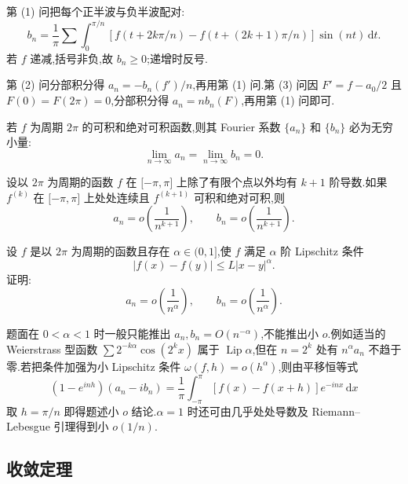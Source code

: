 \begin{solution}
    第 (1) 问把每个正半波与负半波配对:
    \[
        b_n=\dfrac{1}{\pi}\sum\int_0^{\pi/n}
        [f(t+2k\pi/n)-f(t+(2k+1)\pi/n)]\sin(nt)\,\mathrm{d}t.
    \]
    若 $f$ 递减,括号非负,故 $b_n\geq0$;递增时反号.

    第 (2) 问分部积分得 $a_n=-b_n(f')/n$,再用第 (1) 问.第 (3) 问因
    $F'=f-a_0/2$ 且 $F(0)=F(2\pi)=0$,分部积分得 $a_n=nb_n(F)$,再用第 (1) 问即可.
\end{solution}

\begin{proposition}[\markstar]
    若 $f$ 为周期 $2\pi$ 的可积和绝对可积函数,则其 Fourier 系数 $\{a_n\}$ 和 $\{b_n\}$ 必为无穷小量:
    \[
        \displaystyle\lim\limits_{n\to\infty}a_n=\lim\limits_{n\to\infty}b_n=0.
    \]
\end{proposition}

\begin{proposition}[\markstar]
    设以 $2\pi$ 为周期的函数 $f$ 在 $\lbrack -\pi,\pi\rbrack$ 上除了有限个点以外均有 $k+1$ 阶导数.如果 $f^{(k)}$ 在 $\lbrack -\pi,\pi\rbrack$ 上处处连续且 $f^{(k+1)}$ 可积和绝对可积,则
    \[
        a_n=o\left(\dfrac{1}{n^{k+1}}\right),
        \qquad
        b_n=o\left(\dfrac{1}{n^{k+1}}\right).
    \]
\end{proposition}

\begin{example}
    设 $f$ 是以 $2\pi$ 为周期的函数且存在 $\alpha\in(0,1\rbrack$,使 $f$ 满足 $\alpha$ 阶 Lipschitz 条件
    \[
        |f(x)-f(y)|\leq L|x-y|^\alpha.
    \]
    证明:
    \[
        a_n=o\left(\dfrac{1}{n^\alpha}\right),
        \qquad
        b_n=o\left(\dfrac{1}{n^\alpha}\right).
    \]
\end{example}
\exampleblank

\begin{solution}
    题面在 $0<\alpha<1$ 时一般只能推出
    $a_n,b_n=O(n^{-\alpha})$,不能推出小 $o$.例如适当的 Weierstrass 型函数
    $\displaystyle\sum 2^{-k\alpha}\cos(2^kx)$ 属于 $\operatorname{Lip}\alpha$,但在 $n=2^k$ 处有
    $n^\alpha a_n$ 不趋于零.若把条件加强为小 Lipschitz 条件
    $\omega(f,h)=o(h^\alpha)$,则由平移恒等式
    \[
        (1-e^{inh})(a_n-ib_n)=\dfrac{1}{\pi}\int_{-\pi}^{\pi}[f(x)-f(x+h)]e^{-inx}\,\mathrm{d}x
    \]
    取 $h=\pi/n$ 即得题述小 $o$ 结论.$\alpha=1$ 时还可由几乎处处导数及 Riemann--Lebesgue 引理得到小 $o(1/n)$.
\end{solution}



\subsection{收敛定理}

